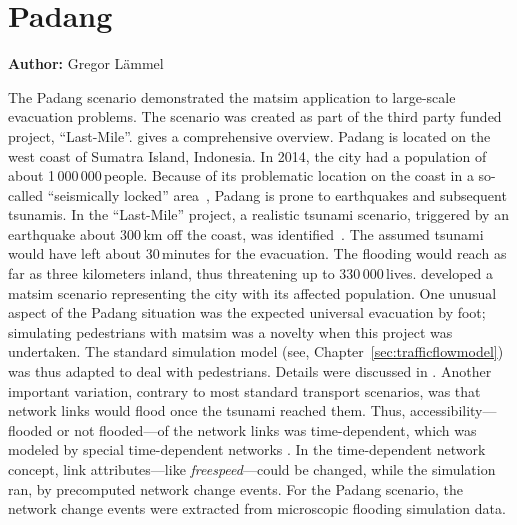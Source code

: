\chapter{Padang}
\label{ch:padang}
\hfill \textbf{Author:} Gregor Lämmel


The Padang scenario demonstrated the \gls{matsim} application to large-scale evacuation problems. The scenario was created as part of the third party funded project, ``Last-Mile''. \citet{00TaubenboeckEtAl2012ConcludingLastMilePaperNatHazards} gives a comprehensive overview.
Padang is located on the west coast of Sumatra Island, Indonesia. In 2014, the city had a population of about 1\,000\,000\,people. 
Because of its problematic location on the coast in a so-called ``seismically locked'' area~\citep{McCloskey2010Padang2009Earthquake}, Padang is prone to earthquakes and subsequent tsunamis. In the ``Last-Mile'' project, a realistic tsunami scenario, triggered by an earthquake about 300\,km off the coast, was identified~\citep{GosebergSchlurmann2009HazardMappingPadang}. The assumed tsunami would have left about 30\,minutes for the evacuation. The flooding would reach as far as three kilometers inland, thus threatening up to 330\,000\,lives. \citet{Laemmel_PhDThesis_2011} developed a \gls{matsim} scenario representing the city with its affected population. One unusual aspect of the Padang situation was the expected universal evacuation by foot; simulating pedestrians with \gls{matsim} was a novelty when this project was undertaken. The standard simulation model (see, \eg Chapter~\ref{sec:trafficflowmodel}) was thus adapted to deal with pedestrians. 
Details were discussed in \citet{00LaemmelKluepfelNagel2009EvacPadangAtBookTimmermanns}. Another important variation, contrary to most standard transport scenarios, was that network links would flood once the tsunami reached them. Thus, accessibility---flooded or not flooded---of the network links was time-dependent, which was modeled by special time-dependent networks \citep{00LaemmelGretherNagel2009TimeDependentNetworks}. In the time-dependent network concept, link attributes---like \emph{freespeed}---could be changed, while the simulation ran, by precomputed network change events. For the Padang scenario, the network change events were extracted from microscopic flooding simulation data.

